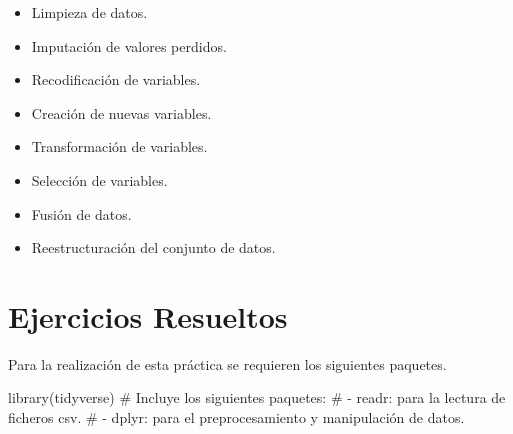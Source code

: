 \documentclass[
  a4paper,
]{scrreport}
\newenvironment{Shaded}{\begin{snugshade}}{\end{snugshade}}
\newcommand{\CommentTok}[1]{\textcolor[rgb]{0.37,0.37,0.37}{#1}}
\newcommand{\FunctionTok}[1]{\textcolor[rgb]{0.28,0.35,0.67}{#1}}
\newcommand{\NormalTok}[1]{\textcolor[rgb]{0.00,0.23,0.31}{#1}}
\providecommand{\tightlist}{%
  \setlength{\itemsep}{0pt}\setlength{\parskip}{0pt}}\usepackage{longtable,booktabs,array}
\theoremstyle{definition}
\theoremstyle{remark}
\begin{document}
\begin{itemize}
\tightlist
\item
  Limpieza de datos.
\item
  Imputación de valores perdidos.
\item
  Recodificación de variables.
\item
  Creación de nuevas variables.
\item
  Transformación de variables.
\item
  Selección de variables.
\item
  Fusión de datos.
\item
  Reestructuración del conjunto de datos.
\end{itemize}

\section{Ejercicios Resueltos}\label{ejercicios-resueltos-1}

Para la realización de esta práctica se requieren los siguientes
paquetes.

\begin{Shaded}
\begin{Highlighting}[]
\FunctionTok{library}\NormalTok{(tidyverse) }
\CommentTok{\# Incluye los siguientes paquetes:}
\CommentTok{\# {-} readr: para la lectura de ficheros csv. }
\CommentTok{\# {-} dplyr: para el preprocesamiento y manipulación de datos.}
\end{Highlighting}
\end{Shaded}
\end{document}
